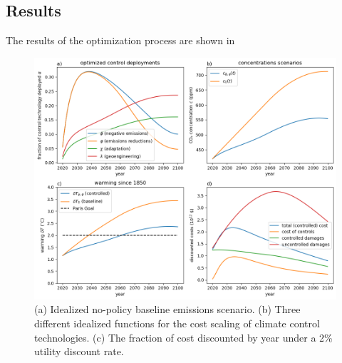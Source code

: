 \documentclass{article}
\begin{document}
\subsection{Results}
The results of the optimization process are shown in 

\begin{figure}[htb!]
\noindent\includegraphics[width=1.0\textwidth]{figures/model_trajectories_optimized.png}
\centering
\caption{(a) Idealized no-policy baseline emissions scenario. (b) Three different idealized functions for the cost scaling of climate control technologies. (c) The fraction of cost discounted by year under a 2\% utility discount rate.}
\label{fig-optimized}
\end{figure}

%
%
\end{document}
